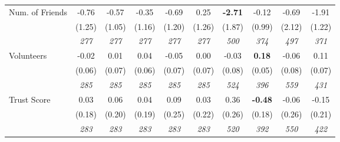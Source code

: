 \begin{tabular}{l c c c c c c c c c}
Num. of Friends & -0.76 & -0.57 & -0.35 & -0.69 & 0.25 & \textbf{ -2.71 } & -0.12 & -0.69 & -1.91 \\
& (1.25) & (1.05) & (1.16) & (1.20) & (1.26) & (1.87) & (0.99) & (2.12) & (1.22) \\
& \textit{ 277 } & \textit{ 277 } & \textit{ 277 } & \textit{ 277 } & \textit{ 277 } & \textit{ 500 } & \textit{ 374 } & \textit{ 497 } & \textit{ 371 } \\
Volunteers & -0.02 & 0.01 & 0.04 & -0.05 & 0.00 & -0.03 & \textbf{0.18} & -0.06 & 0.11 \\
& (0.06) & (0.07) & (0.06) & (0.07) & (0.07) & (0.08) & (0.05) & (0.08) & (0.07) \\
& \textit{ 285 } & \textit{ 285 } & \textit{ 285 } & \textit{ 285 } & \textit{ 285 } & \textit{ 524 } & \textit{ 396 } & \textit{ 559 } & \textit{ 431 } \\
Trust Score & 0.03 & 0.06 & 0.04 & 0.09 & 0.03 & 0.36 & \textbf{-0.48} & -0.06 & -0.15 \\
& (0.18) & (0.20) & (0.19) & (0.25) & (0.22) & (0.26) & (0.18) & (0.26) & (0.21) \\
& \textit{ 283 } & \textit{ 283 } & \textit{ 283 } & \textit{ 283 } & \textit{ 283 } & \textit{ 520 } & \textit{ 392 } & \textit{ 550 } & \textit{ 422 } \\
\bottomrule
\end{tabular}

